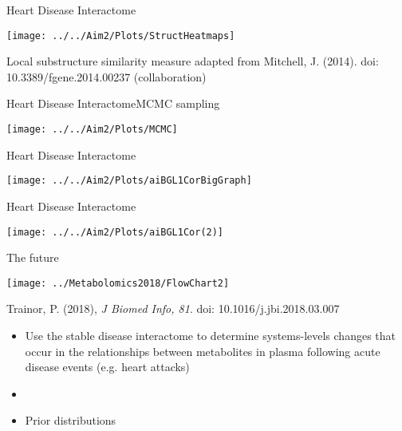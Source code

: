 \documentclass[xcolor=dvipsnames]{beamer}
\begin{document}
\begin{frame}{Heart Disease Interactome}
		\vspace{-15.5pt}
	\begin{center}
		\texttt{[image: ../../Aim2/Plots/StructHeatmaps]}
		
		Local substructure similarity measure adapted from Mitchell, J. (2014). doi: 10.3389/fgene.2014.00237 (collaboration)
	\end{center}
\end{frame}

\begin{frame}{Heart Disease Interactome}{MCMC sampling}
	\vspace{-10.5pt}
	\begin{center}
		\texttt{[image: ../../Aim2/Plots/MCMC]}
	\end{center}
\end{frame}

\begin{frame}{Heart Disease Interactome}
	\vspace{-10.5pt}
	\begin{center}
		\texttt{[image: ../../Aim2/Plots/aiBGL1CorBigGraph]}
	\end{center}
\end{frame}

\begin{frame}{Heart Disease Interactome}
	\vspace{-10.5pt}
	\begin{center}
		\texttt{[image: ../../Aim2/Plots/aiBGL1Cor(2)]}
	\end{center}
\end{frame}

\begin{frame}{The future}
	\vspace{-15pt}
	\begin{center}
		\texttt{[image: ../Metabolomics2018/FlowChart2]}
		
		Trainor, P. (2018), \emph{J Biomed Info, 81}. doi: 10.1016/j.jbi.2018.03.007 \pause
	\end{center}
	\begin{itemize}
		\item Use the stable disease interactome to determine systems-levels changes that occur in the relationships between metabolites in plasma following acute disease events (e.g. heart attacks) \pause
		\item[]
		\item Prior distributions 
	\end{itemize}
\end{frame}
\end{document}
